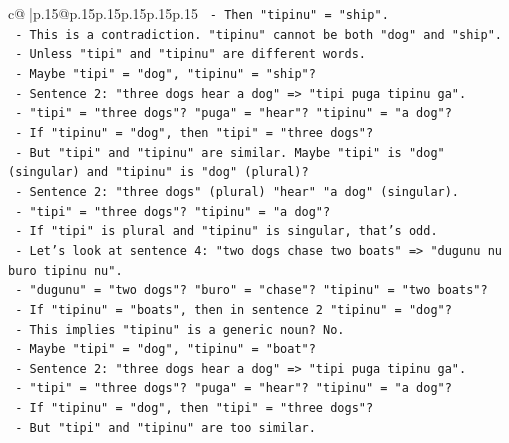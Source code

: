 \documentclass{article}
\begin{document}
{\begin{supertabular}{c@{$\;$}|p{.15\linewidth}@{}p{.15\linewidth}p{.15\linewidth}p{.15\linewidth}p{.15\linewidth}p{.15\linewidth}}
{{{\texttt{                      {-} Then "tipinu" = "ship".} \\
\texttt{                    {-} This is a contradiction. "tipinu" cannot be both "dog" and "ship".} \\
\texttt{                    {-} Unless "tipi" and "tipinu" are different words.} \\
\texttt{                    {-} Maybe "tipi" = "dog", "tipinu" = "ship"?} \\
\texttt{                    {-} Sentence 2: "three dogs hear a dog" => "tipi puga tipinu ga".} \\
\texttt{                      {-} "tipi" = "three dogs"? "puga" = "hear"? "tipinu" = "a dog"?} \\
\texttt{                      {-} If "tipinu" = "dog", then "tipi" = "three dogs"?} \\
\texttt{                      {-} But "tipi" and "tipinu" are similar. Maybe "tipi" is "dog" (singular) and "tipinu" is "dog" (plural)?} \\
\texttt{                      {-} Sentence 2: "three dogs" (plural) "hear" "a dog" (singular).} \\
\texttt{                        {-} "tipi" = "three dogs"? "tipinu" = "a dog"?} \\
\texttt{                        {-} If "tipi" is plural and "tipinu" is singular, that's odd.} \\
\texttt{                      {-} Let's look at sentence 4: "two dogs chase two boats" => "dugunu nu buro tipinu nu".} \\
\texttt{                        {-} "dugunu" = "two dogs"? "buro" = "chase"? "tipinu" = "two boats"?} \\
\texttt{                        {-} If "tipinu" = "boats", then in sentence 2 "tipinu" = "dog"?} \\
\texttt{                        {-} This implies "tipinu" is a generic noun? No.} \\
\texttt{                        {-} Maybe "tipi" = "dog", "tipinu" = "boat"?} \\
\texttt{                        {-} Sentence 2: "three dogs hear a dog" => "tipi puga tipinu ga".} \\
\texttt{                          {-} "tipi" = "three dogs"? "puga" = "hear"? "tipinu" = "a dog"?} \\
\texttt{                          {-} If "tipinu" = "dog", then "tipi" = "three dogs"?} \\
\texttt{                          {-} But "tipi" and "tipinu" are too similar.} \\
}}}
\end{supertabular}}
\end{document}
